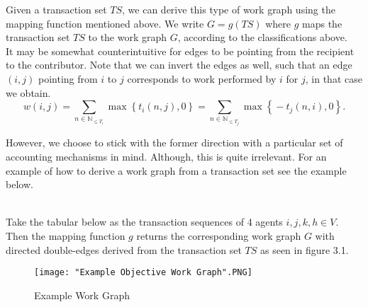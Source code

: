 \noindent{}Given a transaction set $TS$, we can derive this type of work graph using the mapping function mentioned above. We write $G=g(TS)$ where $g$ maps the transaction set $TS$ to the work graph $G$, according to the classifications above. \vspace{1em}\\

\noindent{}It may be somewhat counterintuitive for edges to be pointing from the recipient to the contributor. Note that we can invert the edges as well, such that an edge $(i,j)$ pointing from $i$ to $j$ corresponds to work performed by $i$ for $j$, in that case we obtain. 
\[
w(i,j) = \sum\limits_{n\in\mathbb{N}_{\leq{}T_i}}\max\left\lbrace{}t_i(n,j), 0 \right\rbrace = \sum\limits_{n\in\mathbb{N}_{\leq{}T_j}}\max\left\lbrace{}-t_j(n,i),0\right\rbrace.
\]

\noindent{}However, we choose to stick with the former direction with a particular set of accounting mechanisms in mind. Although, this is quite irrelevant. For an example of how to derive a work graph from a transaction set see the example below.\vspace{1em}\\

\begin{example}[]\ \\
\label{ex:Example Transaction Set and Work Graph}
\noindent{}Take the tabular below as the transaction sequences of 4 agents $i,j,k,h\in{}V$. Then the mapping function $g$ returns the corresponding work graph $G$ with directed double-edges derived from the transaction set $TS$ as seen in figure 3.1. \vspace{1em}\\

\begin{comment}


\begin{tabular}{c|c|c|c}
$i$ & $k$ & $j$ & $h$ \\
\hline
$(i,j,3)$ & $(k,j,2)$ & $(j,h,4)$ & $(h,i,9)$ \\
$(h,i,9)$ & $(i,k,2)$ & $(j,i,1)$ & $(j,h,4)$ \\
$(j,i,1)$ &           & $(i,j,3)$ &           \\  
$(i,k,2)$ & 		  & $(k,j,2)$ & 
\end{tabular}
\end{example}


\end{comment}

\begin{figure}[H]
\texttt{[image: "Example Objective Work Graph".PNG]}
\label{fig:Example Work Graph}
\caption{Example Work Graph}
\end{figure}
\end{example}


